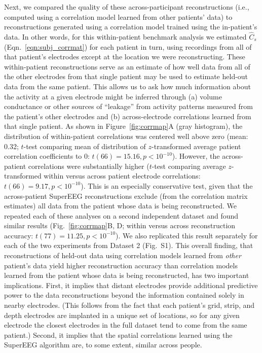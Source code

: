 \documentclass[11pt]{article}
\newcommand{\perexpcorrmaps}{S1}
\begin{document}
Next, we compared the quality of these
across-participant reconstructions (i.e., computed using a correlation
model learned from other patients' data) to reconstructions generated
using a correlation model trained using the in-patient's data.  In
other words, for this within-patient benchmark analysis we estimated
$\hat{C}_{s}$ (Eqn.~\ref{eqn:subj_corrmat}) for each patient in turn,
using recordings from all of that patient's electrodes except at the
location we were reconstructing.  These within-patient reconstructions
serve as an estimate of how well data from all of the other electrodes
from that single patient may be used to estimate held-out data from
the same patient.  This allows us to ask how much information about
the activity at a given electrode might be inferred through (a) volume
conductance or other sources of ``leakage'' from activity patterns
measured from the patient's other electrodes and (b) across-electrode
correlations learned from that single patient.  As shown in
Figure~\ref{fig:corrmap}A (gray histogram), the distribution of
within-patient correlations was centered well above zero (mean: 0.32;
$t$-test comparing mean of distribution of $z$-transformed average
patient correlation coefficients to 0: $t(66) = 15.16, p < 10^{-10}$).
However, the across-patient correlations were substantially higher
($t$-test comparing average $z$-transformed within versus across
patient electrode correlations: $t(66) = 9.17, p < 10^{-10}$).  This
is an especially conservative test, given that the across-patient
SuperEEG reconstructions exclude (from the correlation matrix
estimates) all data from the patient whose data is being
reconstructed.  We repeated each of these analyses on a second
independent dataset and found similar results
(Fig.~\ref{fig:corrmap}B, D; within versus across reconstruction
accuracy: $t(77) = 11.25, p < 10^{-10}$). We also replicated this result
separately for each of the two experiments from Dataset 2
(Fig.~\perexpcorrmaps).  This overall finding, that reconstructions of
held-out data using correlation models learned from \textit{other}
patient's data yield higher reconstruction accuracy than correlation
models learned from the patient whose data is being reconstructed, has
two important implications.  First, it implies that distant electrodes
provide additional predictive power to the data reconstructions beyond
the information contained solely in nearby electrodes.  (This follows
from the fact that each patient's grid, strip, and depth electrodes
are implanted in a unique set of locations, so for any given electrode
the closest electrodes in the full dataset tend to come from the
same patient.)  Second, it implies that the spatial correlations
learned using the SuperEEG algorithm are, to some extent, similar
across people.
\end{document}
